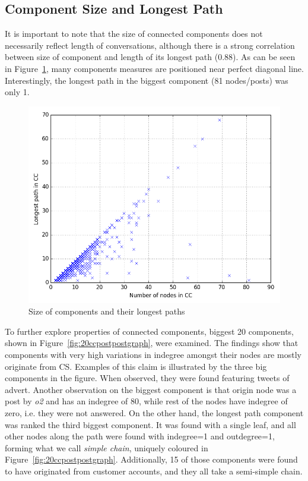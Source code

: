 \documentclass[sigconf]{acmart}
\begin{document}

\subsection{Component Size and Longest Path}

It is important to note that the size of connected components does not
necessarily reflect length of conversations, although there is a
strong correlation between size of component and length of its longest
path (0.88). As can be seen in Figure~\ref{fig:ccsizepaths}, many components
measures are positioned near perfect diagonal line. Interestingly, the 
longest path in the biggest component (81 nodes/posts) was only 1.

\begin{figure}[htb]
\centering
\includegraphics[width=\columnwidth]{images/ccsizepaths.png}
\caption{Size of components and their longest paths}
\label{fig:ccsizepaths}
\end{figure}

To further explore properties of connected components, biggest 20
components, shown in Figure~\ref{fig:20ccpostpostgraph}, were examined. 
The findings show that components with very high variations in indegree
amongst their nodes are mostly originate from CS. Examples of this claim 
is illustrated by the three big components in the figure. When observed, they 
were found featuring tweets of advert. Another observation on the biggest 
component is that origin node was a post by {\emph{o2}} and 
has an indegree of 80, while rest of the nodes have indegree of zero, i.e. they 
were not answered. On the other hand, the longest path component was ranked the 
third biggest component. It was found with a single leaf, and all other nodes along
the path were found with indegree=1 and outdegree=1, forming what we call {\emph{simple
chain}}, uniquely coloured in Figure~\ref{fig:20ccpostpostgraph}. Additionally, 15 of those
components were found to have originated from customer accounts, and
they all take a semi-simple chain.
\end{document}
